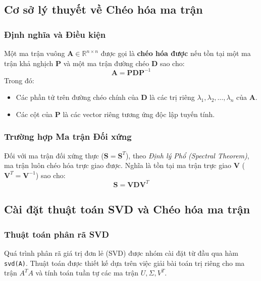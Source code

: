 \documentclass[a4paper]{article}
\begin{document}
\subsection{Cơ sở lý thuyết về Chéo hóa ma trận}

\subsubsection{Định nghĩa và Điều kiện}
Một ma trận vuông $\mathbf{A} \in \mathbb{R}^{n \times n}$ được gọi là \textbf{chéo hóa được} nếu tồn tại một ma trận khả nghịch $\mathbf{P}$ và một ma trận đường chéo $\mathbf{D}$ sao cho:
\begin{equation}
    \mathbf{A} = \mathbf{P}\mathbf{D}\mathbf{P}^{-1}
\end{equation}
Trong đó:
\begin{itemize}
    \item Các phần tử trên đường chéo chính của $\mathbf{D}$ là các trị riêng $\lambda_1, \lambda_2, \dots, \lambda_n$ của $\mathbf{A}$.
    \item Các cột của $\mathbf{P}$ là các vector riêng tương ứng độc lập tuyến tính.
\end{itemize}

\subsubsection{Trường hợp Ma trận Đối xứng}
Đối với ma trận đối xứng thực ($\mathbf{S} = \mathbf{S}^T$), theo \textit{Định lý Phổ (Spectral Theorem)}, ma trận luôn chéo hóa trực giao được. Nghĩa là tồn tại ma trận trực giao $\mathbf{V}$ ($\mathbf{V}^T = \mathbf{V}^{-1}$) sao cho:
\begin{equation}
    \mathbf{S} = \mathbf{V}\mathbf{D}\mathbf{V}^T
\end{equation}


\subsection{Cài đặt thuật toán SVD và Chéo hóa ma trận}
\subsubsection{Thuật toán phân rã SVD}

Quá trình phân rã giá trị đơn lẻ (SVD) được nhóm cài đặt từ đầu qua hàm \texttt{svd(A)}. Thuật toán được thiết kế dựa trên việc giải bài toán trị riêng cho ma trận $A^T A$ và tính toán tuần tự các ma trận $U, \Sigma, V^T$.
\end{document}
